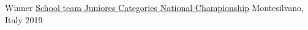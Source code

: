 


\begin{cvhonors}

  \cvhonor
    {Winner}
    {\href{https://www.trofeoscacchiscuola.it//}{School team Juniores Categories National Championship}}
    {Montesilvano, Italy}
    {2019}

\end{cvhonors}






